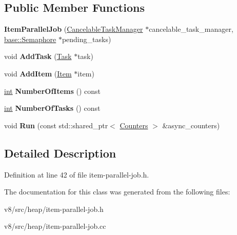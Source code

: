 \subsection*{Public Member Functions}
\begin{DoxyCompactItemize}
\item 
\mbox{\label{classv8_1_1internal_1_1ItemParallelJob_a7c8e87da3b4830fea7cf63b186f15700}} 
{\bfseries Item\+Parallel\+Job} (\mbox{\hyperlink{classv8_1_1internal_1_1CancelableTaskManager}{Cancelable\+Task\+Manager}} $\ast$cancelable\+\_\+task\+\_\+manager, \mbox{\hyperlink{classv8_1_1base_1_1Semaphore}{base\+::\+Semaphore}} $\ast$pending\+\_\+tasks)
\item 
\mbox{\label{classv8_1_1internal_1_1ItemParallelJob_aeb3bcccbbf53ae07a1ddfd9b35f66674}} 
void {\bfseries Add\+Task} (\mbox{\hyperlink{classv8_1_1internal_1_1ItemParallelJob_1_1Task}{Task}} $\ast$task)
\item 
\mbox{\label{classv8_1_1internal_1_1ItemParallelJob_ab63591755796895ecccf1005e1058d58}} 
void {\bfseries Add\+Item} (\mbox{\hyperlink{classv8_1_1internal_1_1ItemParallelJob_1_1Item}{Item}} $\ast$item)
\item 
\mbox{\label{classv8_1_1internal_1_1ItemParallelJob_a1380becc8b4d1f17b4d60ad4121bc543}} 
\mbox{\hyperlink{classint}{int}} {\bfseries Number\+Of\+Items} () const
\item 
\mbox{\label{classv8_1_1internal_1_1ItemParallelJob_ab908d93ebf0f004029957a88b5328c68}} 
\mbox{\hyperlink{classint}{int}} {\bfseries Number\+Of\+Tasks} () const
\item 
\mbox{\label{classv8_1_1internal_1_1ItemParallelJob_a7c3822b76d9485d5d038e8c999623fab}} 
void {\bfseries Run} (const std\+::shared\+\_\+ptr$<$ \mbox{\hyperlink{classv8_1_1internal_1_1Counters}{Counters}} $>$ \&async\+\_\+counters)
\end{DoxyCompactItemize}


\subsection{Detailed Description}


Definition at line 42 of file item-\/parallel-\/job.\+h.



The documentation for this class was generated from the following files\+:\begin{DoxyCompactItemize}
\item 
v8/src/heap/item-\/parallel-\/job.\+h\item 
v8/src/heap/item-\/parallel-\/job.\+cc\end{DoxyCompactItemize}
